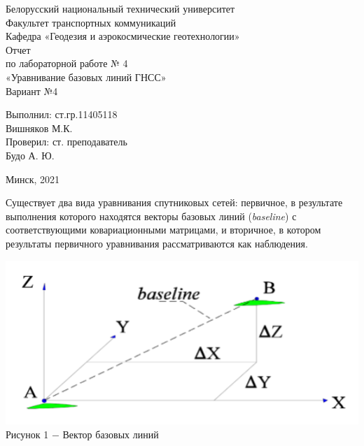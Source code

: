 \documentclass[a4paper]{article}
\begin{document}
\begin{titlepage}
\begin{center}
\large{Белорусский национальный технический университет}\\
\large{Факультет транспортных коммуникаций}\\
\large{Кафедра «Геодезия и аэрокосмические геотехнологии»}\\
\hfill \break
\hfill \break
\hfill \break
\hfill \break
\hfill \break
\hfill \break
\hfill \break
\hfill \break
\hfill \break
\large{Отчет\\
 по лабораторной работе № 4\\
«Уравнивание базовых линий ГНСС»\\
Вариант №4\\}
\hfill \break
\hfill \break
\hfill \break
\hfill \break
\end{center}
\begin{flushright}
  \large{Выполнил: ст.гр.11405118\\
	Вишняков М.К.\\
	Проверил: ст. преподаватель\\
	Будо А. Ю.\\}
\end{flushright}
\begin{center}
\hfill \break
\hfill \break
\large{Минск, 2021\\}
\end{center}
\end{titlepage}
\large{Существует два вида уравнивания спутниковых сетей: первичное, в результате выполнения которого находятся векторы базовых линий (\textit{baseline}) с соответствующими ковариационными матрицами, и вторичное, в котором результаты первичного уравнивания рассматриваются как наблюдения.}
\begin{center}
    \includegraphics[scale=1]{images/images_1.png}\\
    Рисунок 1 $-$ Вектор базовых линий
\end{center}
\end{document}
